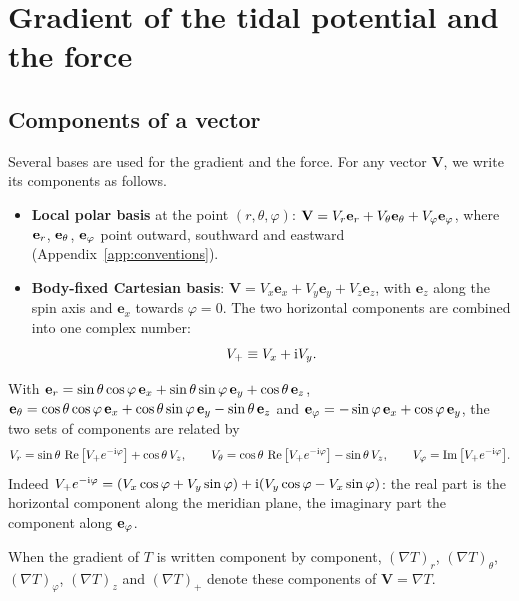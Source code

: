 \chapter{Gradient of the tidal potential and the force}\label{ch:gradient}

\section{Components of a vector}\label{sec:components}
Several bases are used for the gradient and the force. For any vector $\mathbf V$, we write its components as follows.
\begin{itemize}
  \item \textbf{Local polar basis} at the point $(r,\theta,\varphi)$: $\mathbf V=V_r\mathbf e_r+V_\theta\mathbf e_\theta+V_\varphi\mathbf e_\varphi$, where $\mathbf e_r$, $\mathbf e_\theta$, $\mathbf e_\varphi$ point outward, southward and eastward (Appendix~\ref{app:conventions}).
  \item \textbf{Body-fixed Cartesian basis}: $\mathbf V=V_x\mathbf e_x+V_y\mathbf e_y+V_z\mathbf e_z$, with $\mathbf e_z$ along the spin axis and $\mathbf e_x$ towards $\varphi=0$. The two horizontal components are combined into one complex number:
  \begin{equation}
    V_+\equiv V_x+\mathrm{i} V_y. \label{eq:Vplus}
  \end{equation}
\end{itemize}
With $\mathbf e_r=\sin\theta\cos\varphi\,\mathbf e_x+\sin\theta\sin\varphi\,\mathbf e_y+\cos\theta\,\mathbf e_z$, $\mathbf e_\theta=\cos\theta\cos\varphi\,\mathbf e_x+\cos\theta\sin\varphi\,\mathbf e_y-\sin\theta\,\mathbf e_z$ and $\mathbf e_\varphi=-\sin\varphi\,\mathbf e_x+\cos\varphi\,\mathbf e_y$, the two sets of components are related by
\begin{equation}
  V_r=\sin\theta\,\operatorname{Re}\big[V_+e^{-\mathrm{i}\varphi}\big]+\cos\theta\,V_z,\qquad
  V_\theta=\cos\theta\,\operatorname{Re}\big[V_+e^{-\mathrm{i}\varphi}\big]-\sin\theta\,V_z,\qquad
  V_\varphi=\operatorname{Im}\big[V_+e^{-\mathrm{i}\varphi}\big]. \label{eq:polar-from-cart}
\end{equation}
Indeed $V_+e^{-\mathrm{i}\varphi}=(V_x\cos\varphi+V_y\sin\varphi)+\mathrm{i}(V_y\cos\varphi-V_x\sin\varphi)$: the real part is the horizontal component along the meridian plane, the imaginary part the component along $\mathbf e_\varphi$.

When the gradient of $T$ is written component by component, $(\nabla T)_r$, $(\nabla T)_\theta$, $(\nabla T)_\varphi$, $(\nabla T)_z$ and $(\nabla T)_+$ denote these components of $\mathbf V=\nabla T$.


